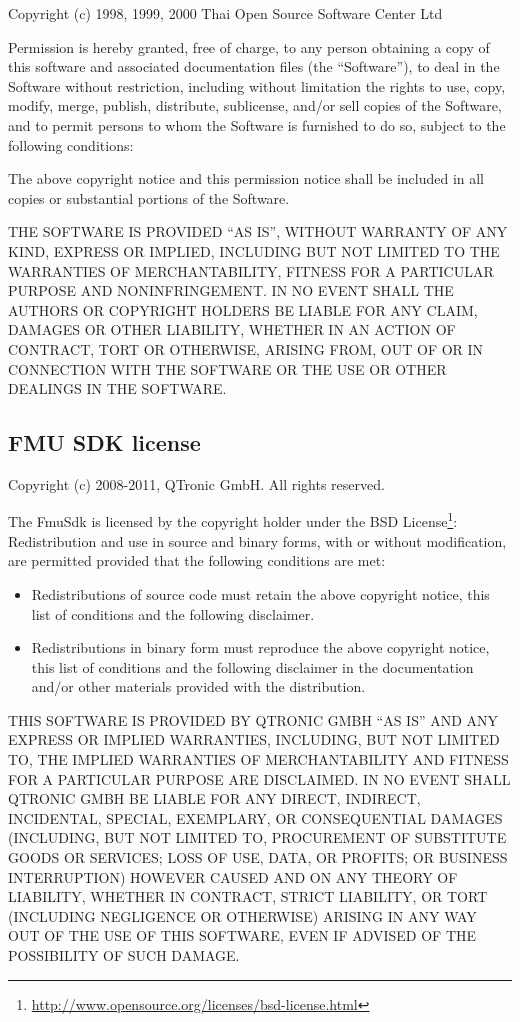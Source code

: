 Copyright (c) 1998, 1999, 2000 Thai Open Source Software Center Ltd

Permission is hereby granted, free of charge, to any person obtaining a copy of this software and associated documentation files (the ``Software''), to deal in the Software without restriction, including without limitation the rights to use, copy, modify, merge, publish, distribute, sublicense, and/or sell copies of the Software, and to permit persons to whom the Software is furnished to do so, subject to the following conditions:

The above copyright notice and this permission notice shall be included in all copies or substantial portions of the Software.

THE SOFTWARE IS PROVIDED ``AS IS'', WITHOUT WARRANTY OF ANY KIND, EXPRESS OR IMPLIED, INCLUDING BUT NOT LIMITED TO THE WARRANTIES OF MERCHANTABILITY, FITNESS FOR A PARTICULAR PURPOSE AND NONINFRINGEMENT. IN NO EVENT SHALL THE AUTHORS OR COPYRIGHT HOLDERS BE LIABLE FOR ANY CLAIM, DAMAGES OR OTHER LIABILITY, WHETHER IN AN ACTION OF CONTRACT, TORT OR OTHERWISE, ARISING FROM, OUT OF OR IN CONNECTION WITH THE SOFTWARE OR THE USE OR OTHER DEALINGS IN THE SOFTWARE.

\subsection{FMU SDK license}\label{fmu-sdk-license}

Copyright (c) 2008-2011, QTronic GmbH. All rights reserved.

The FmuSdk is licensed by the copyright holder under the BSD License\footnote{\url{http://www.opensource.org/licenses/bsd-license.html}}: Redistribution and use in source and binary forms, with or without modification, are permitted provided that the following conditions are met:

\begin{itemize}
\item
  Redistributions of source code must retain the above copyright notice, this list of conditions and the following disclaimer.
\item
  Redistributions in binary form must reproduce the above copyright notice, this list of conditions and the following disclaimer in the documentation and/or other materials provided with the distribution.
\end{itemize}

THIS SOFTWARE IS PROVIDED BY QTRONIC GMBH ``AS IS'' AND ANY EXPRESS OR IMPLIED WARRANTIES, INCLUDING, BUT NOT LIMITED TO, THE IMPLIED WARRANTIES OF MERCHANTABILITY AND FITNESS FOR A PARTICULAR PURPOSE ARE DISCLAIMED. IN NO EVENT SHALL QTRONIC GMBH BE LIABLE FOR ANY DIRECT, INDIRECT, INCIDENTAL, SPECIAL, EXEMPLARY, OR CONSEQUENTIAL DAMAGES (INCLUDING, BUT NOT LIMITED TO, PROCUREMENT OF SUBSTITUTE GOODS OR SERVICES; LOSS OF USE, DATA, OR PROFITS; OR BUSINESS INTERRUPTION) HOWEVER CAUSED AND ON ANY THEORY OF LIABILITY, WHETHER IN CONTRACT, STRICT LIABILITY, OR TORT (INCLUDING NEGLIGENCE OR OTHERWISE) ARISING IN ANY WAY OUT OF THE USE OF THIS SOFTWARE, EVEN IF ADVISED OF THE POSSIBILITY OF SUCH DAMAGE.

